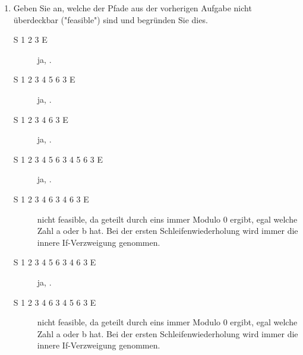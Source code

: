 \documentclass{bschlangaul-aufgabe}
\begin{document}
\begin{enumerate}
%

\item Geben Sie an, welche der Pfade aus der vorherigen Aufgabe nicht
überdeckbar ("feasible") sind und begründen Sie dies.

\begin{bAntwort}

\begin{description}
\item[S 1 2 3 E]
ja, \zB {}.
\end{description}


\begin{description}
\item[S 1 2 3 4 5 6 3 E]
ja, \zB {}.

\item[S 1 2 3 4 6 3 E]
ja, \zB {}.
\end{description}


\begin{description}
\item[S 1 2 3 4 5 6 3 4 5 6 3 E]
ja, \zB {}.

\item[S 1 2 3 4 6 3 4 6 3 E]
nicht feasible, da geteilt durch eins immer Modulo 0 ergibt, egal welche
Zahl a oder b hat. Bei der ersten Schleifenwiederholung wird immer die
innere If-Verzweigung genommen.

\item[S 1 2 3 4 5 6 3 4 6 3 E]
ja, \zB {}.

\item[S 1 2 3 4 6 3 4 5 6 3 E]
nicht feasible, da geteilt durch eins immer Modulo 0 ergibt, egal welche
Zahl a oder b hat. Bei der ersten Schleifenwiederholung wird immer die
innere If-Verzweigung genommen.
\end{description}
\end{bAntwort}

\end{enumerate}
\end{document}
